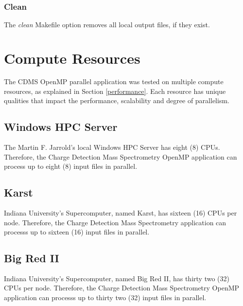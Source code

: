 \documentclass[9pt,twocolumn,twoside]{../../styles/osajnl}
\begin{document}
\subsubsection{Clean}
The \emph{clean} Makefile option removes all local output files, if
they exist.

\section{Compute Resources} \label{resources}
The CDMS OpenMP parallel application was tested on multiple compute
resources, as explained in Section \ref{performance}. Each resource
has unique qualities that impact the performance, scalability and
degree of parallelism. 
\subsection{Windows HPC Server}
The Martin F. Jarrold's local Windows HPC Server has eight (8)
CPUs. Therefore, the Charge Detection Mass Spectrometry OpenMP
application can process up to eight (8) input files in parallel.
\subsection{Karst}
Indiana University's Supercomputer, named Karst, has sixteen (16) CPUs
per node. Therefore, the Charge Detection Mass Spectrometry
application can processs up to sixteen (16) input files in parallel.
\subsection{Big Red II}
Indiana University's Supercomputer, named Big Red II, has thirty two
(32) CPUs per node. Therefore, the Charge Detection Mass Spectrometry
OpenMP application can processs up to thirty two (32) input files in
parallel.
\end{document}
